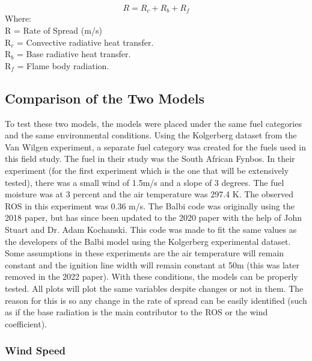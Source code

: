 \documentclass{article}
\begin{document}
\begin{equation}
	R = R_c + R_b + R_f
	\label{Balbi ROS equation}
\end{equation}
Where: \\
\noindent R = Rate of Spread (m/s) \\
R$_c$ = Convective radiative heat transfer.\\
R$_b$ = Base radiative heat transfer.\\
R$_f$ = Flame body radiation. 
\subsection{Comparison of the Two Models}
\indent To test these two models, the models were placed under the same fuel categories and the same environmental conditions. Using the Kolgerberg dataset from the Van Wilgen experiment, a separate fuel category was created for the fuels used in this field study. The fuel in their study was the South African Fynbos. In their experiment (for the first experiment which is the one that will be extensively tested), there was a small wind of 1.5m/s and a slope of 3 degrees. The fuel moisture was at 3 percent and the air temperature was 297.4 K. The observed ROS in this experiment was 0.36 m/s. The Balbi code was originally using the 2018 paper, but has since been updated to the 2020 paper with the help of John Stuart and Dr. Adam Kochanski. This code was made to fit the same values as the developers of the Balbi model using the Kolgerberg experimental dataset. Some assumptions in these experiments are the air temperature will remain constant and the ignition line width will remain constant at 50m (this was later removed in the 2022 paper). With these conditions, the models can be properly tested. All plots will plot the same variables despite changes or not in them. The reason for this is so any change in the rate of spread can be easily identified (such as if the base radiation is the main contributor to the ROS or the wind coefficient). 
\subsubsection{Wind Speed}
\end{document}
